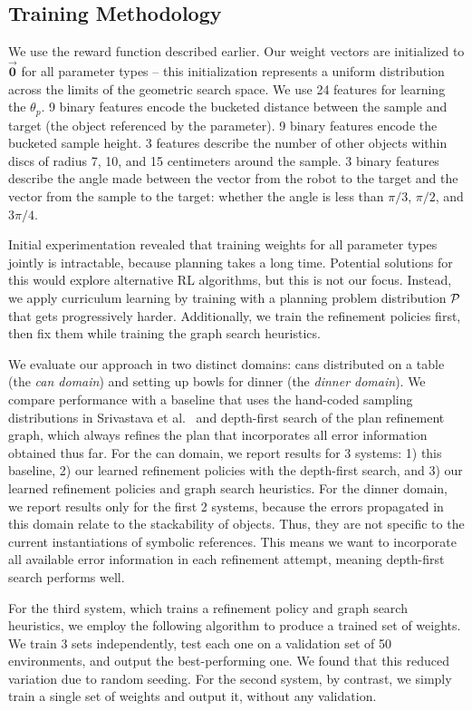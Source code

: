 \subsection{Training Methodology}
We use the reward function described earlier. Our weight
vectors are initialized to $\vec{\mathbf{0}}$ for all parameter types -- this
initialization represents a uniform distribution across the limits of the geometric search space.
We use 24 features for learning the $\theta_{p}$. 9 binary features encode the bucketed distance between the sample
and target (the object referenced by the parameter). 9 binary features encode the bucketed sample height. 3 features
describe the number of other objects within discs of radius 7, 10, and 15 centimeters around the
sample. 3 binary features describe the angle made between the vector from the
robot to the target and the vector from the sample to the target: whether the angle is less than
$\pi/3$, $\pi/2$, and $3\pi/4$.

Initial experimentation revealed that training weights for all parameter types jointly is intractable,
because planning takes a long time. Potential solutions for this would explore alternative RL algorithms,
but this is not our focus. Instead, we apply curriculum learning by training with a planning problem distribution
$\mathcal{P}$ that gets progressively harder. Additionally, we train the refinement policies first, then fix them while
training the graph search heuristics.

We evaluate our approach in two distinct domains: cans distributed on a table (the \emph{can domain})
and setting up bowls for dinner (the \emph{dinner domain}).
We compare performance with a baseline that uses the hand-coded sampling distributions
in Srivastava et al.~\cite{srivastava2014combined} and depth-first search of the
plan refinement graph, which always refines the plan that incorporates all error information obtained
thus far. For the can domain, we report results for 3 systems: 1) this baseline, 2) our learned refinement policies
with the depth-first search, and 3) our learned refinement policies and graph search heuristics.
For the dinner domain, we report results only for the first 2 systems, because the errors propagated in this
domain relate to the stackability of objects.
Thus, they are not specific to the current instantiations of symbolic references. This means we want to incorporate
all available error information in each refinement attempt, meaning depth-first search performs well.

For the third system, which trains a refinement policy and graph search heuristics, we employ the following
algorithm to produce a trained set of weights. We train 3 sets independently, test each
one on a validation set of 50 environments, and output the best-performing one. We found that this
reduced variation due to random seeding. For the second system, by contrast, we simply train a single
set of weights and output it, without any validation.

